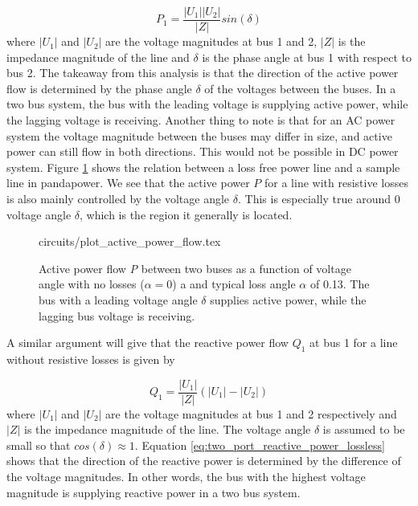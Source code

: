 \documentclass[class=book, crop=false]{standalone}
\begin{document}
\begin{equation}\label{eq:two_port_active_power_lossless}
P_{1} =  \frac{|U_{1}||U_{2}|}{|Z|}sin(\delta)
\end{equation}
where $|U_{1}|$ and $|U_{2}|$ are the voltage magnitudes at bus 1 and 2, $|Z|$ is the impedance magnitude of the line and $\delta$ is the phase angle at bus 1 with respect to bus 2. The takeaway from this analysis is that the direction of the active power flow is determined by the phase angle $\delta$ of the voltages between the buses. In a two bus system, the bus with the leading voltage is supplying active power, while the lagging voltage is receiving. Another thing to note is that for an AC power system the voltage magnitude between the buses may differ in size, and active power can still flow in both directions. This would not be possible in DC power system. Figure \ref{fig:theory:active_power_flow} shows the relation between a loss free power line and a sample line in pandapower. We see that the active power $P$ for a line with resistive losses is also mainly controlled by the voltage angle $\delta$. This is especially true around 0 voltage angle $\delta$, which is the region it generally is located. 


\begin{figure}[ht!]
    \center
    {circuits/plot_active_power_flow.tex}
    \caption[size = 9]{Active power flow \textit{P} between two buses as a function of voltage angle with no losses ($\alpha=0$) a and typical loss angle $\alpha$ of 0.13. The bus with a leading voltage angle $\delta$ supplies active power, while the lagging bus voltage is receiving.} \label{fig:theory:active_power_flow}
\end{figure}

A similar argument will give that the reactive power flow $Q_{1}$ at bus 1 for a line without resistive losses is given by 

\begin{equation}\label{eq:two_port_reactive_power_lossless}
Q_{1} =  \frac{|U_{1}|}{|Z|}(|U_{1}| - |U_{2}|)
\end{equation}
where $|U_{1}|$ and $|U_{2}|$ are the voltage magnitudes at bus 1 and 2 respectively and $|Z|$ is the impedance magnitude of the line. The voltage angle $\delta$ is assumed to be small so that $cos(\delta) \approx 1$. Equation \eqref{eq:two_port_reactive_power_lossless} shows that the direction of the reactive power is determined by the difference of the voltage magnitudes. In other words, the bus with the highest voltage magnitude is supplying reactive power in a two bus system.
\end{document}
